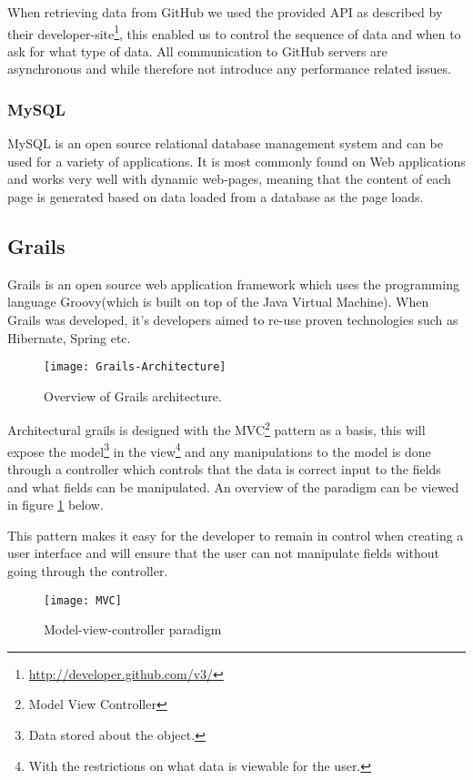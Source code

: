 When retrieving data from GitHub we used the provided API as described by their developer-site\footnote{\url{http://developer.github.com/v3/}}, this enabled us to control the sequence of data and when to ask for what type of data. All communication to GitHub servers are asynchronous and while therefore not introduce any performance related issues. 

\subsubsection{MySQL}
MySQL is an open source relational database management system and can be used for a variety of applications. It is most commonly found on Web applications and works very well with dynamic web-pages, meaning that the content of each page is generated based on data loaded from a database as the page loads.

\subsection{Grails}
Grails is an open source web application framework which uses the programming language Groovy(which is built on top of the Java Virtual Machine). When Grails was developed, it's developers aimed to re-use proven technologies such as Hibernate, Spring etc. 

\begin{figure}[H]
\centering
    \texttt{[image: Grails-Architecture]}
\caption{Overview of Grails architecture.}
\end{figure}

Architectural grails is designed with the MVC\footnote{Model View Controller} pattern as a basis, this will expose the model\footnote{Data stored about the object.} in the view\footnote{With the restrictions on what data is viewable for the user.} and any manipulations to the model is done through a controller which controls that the data is correct input to the fields and what fields can be manipulated. An overview of the paradigm can be viewed in figure \ref{mvc-paradigm} below.

This pattern makes it easy for the developer to remain in control when creating a user interface and will ensure that the user can not manipulate fields without going through the controller.

\begin{figure}[H]
    \centering
        \texttt{[image: MVC]}
    \caption{Model-view-controller paradigm}
    \label{mvc-paradigm}
\end{figure}

